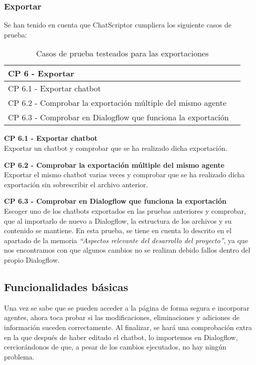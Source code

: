 \subsubsection{Exportar}
Se han tenido en cuenta que ChatScriptor cumpliera los siguiente casos de prueba:

\begin{table}[H]
\centering
\begin{tabular}{ll}
\toprule
CP 6 - Exportar   \\
\midrule
CP 6.1 - Exportar chatbot   \\
CP 6.2 - Comprobar la exportación múltiple del mismo agente \\
CP 6.3 - Comprobar en Dialogflow que funciona la exportación \\
\bottomrule
\end{tabular}
\caption{Casos de prueba testeados para las exportaciones}
\end{table}

\textbf{CP 6.1 - Exportar chatbot} \\
Exportar un chatbot y comprobar que se ha realizado dicha exportación.

\textbf{CP 6.2 - Comprobar la exportación múltiple del mismo agente} \\
Exportar el mismo chatbot varias veces y comprobar que se ha realizado dicha exportación sin sobrescribir el archivo anterior.

\textbf{CP 6.3 - Comprobar en Dialogflow que funciona la exportación} \\
Escoger uno de los chatbots exportados en las pruebas anteriores y comprobar, que al importarlo de nuevo a Dialogflow, la estructura de los archivos y su contenido se mantiene. En esta prueba, se tiene en cuenta lo descrito en el apartado de la memoria \textit{``Aspectos relevante del desarrollo del proyecto''}, ya que nos encontramos con que algunos cambios no se realizan debido fallos dentro del propio Dialogflow.

\subsection{Funcionalidades básicas}
Una vez se sabe que se pueden acceder a la página de forma segura e incorporar agentes, ahora toca probar si las modificaciones, eliminaciones y adiciones de información suceden correctamente. Al finalizar, se hará una comprobación extra en la que después de haber editado el chatbot, lo importemos en Dialogflow, cerciorándonos de que, a pesar de los cambios ejecutados, no hay ningún problema.

